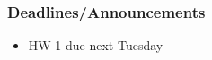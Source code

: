 
\begin{frame}
    \frametitle{Deadlines/Announcements}
    \begin{itemize}
        \item HW 1 due next Tuesday
    \end{itemize}
\end{frame}
